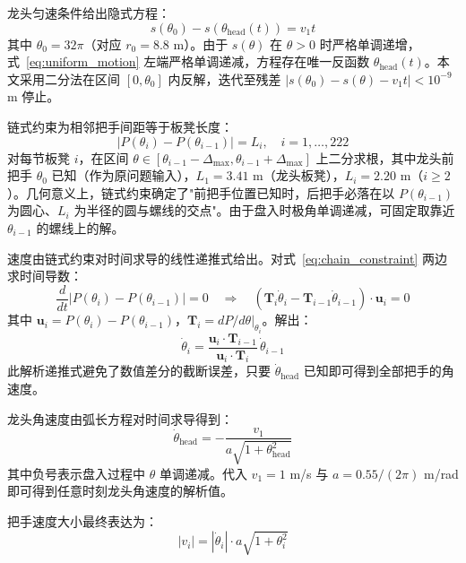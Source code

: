 \documentclass[12pt,a4paper]{article}
\begin{document}
龙头匀速条件给出隐式方程：
\begin{equation}
s(\theta_0) - s(\theta_{\text{head}}(t)) = v_1 t
\label{eq:uniform_motion}
\end{equation}
其中 $\theta_0=32\pi$（对应 $r_0=8.8$ m）。由于 $s(\theta)$ 在 $\theta>0$ 时严格单调递增，式~\eqref{eq:uniform_motion} 左端严格单调递减，方程存在唯一反函数 $\theta_{\text{head}}(t)$。本文采用二分法在区间 $[0,\theta_0]$ 内反解，迭代至残差 $|s(\theta_0)-s(\theta)-v_1t|<10^{-9}$ m 停止。

链式约束为相邻把手间距等于板凳长度：
\begin{equation}
|P(\theta_i)-P(\theta_{i-1})| = L_i,\quad i=1,\ldots,222
\label{eq:chain_constraint}
\end{equation}
对每节板凳 $i$，在区间 $\theta\in[\theta_{i-1}-\Delta_{\max},\theta_{i-1}+\Delta_{\max}]$ 上二分求根，其中龙头前把手 $\theta_0$ 已知（作为原问题输入），$L_1=3.41$ m（龙头板凳），$L_i=2.20$ m（$i\geq 2$）。几何意义上，链式约束确定了"前把手位置已知时，后把手必落在以 $P(\theta_{i-1})$ 为圆心、$L_i$ 为半径的圆与螺线的交点"。由于盘入时极角单调递减，可固定取靠近 $\theta_{i-1}$ 的螺线上的解。

速度由链式约束对时间求导的线性递推式给出。对式~\eqref{eq:chain_constraint} 两边求时间导数：
\begin{equation}
\frac{d}{dt}|P(\theta_i)-P(\theta_{i-1})| = 0
\quad\Rightarrow\quad
(\mathbf{T}_i\dot{\theta}_i - \mathbf{T}_{i-1}\dot{\theta}_{i-1})\cdot\mathbf{u}_i = 0
\end{equation}
其中 $\mathbf{u}_i = P(\theta_i)-P(\theta_{i-1})$，$\mathbf{T}_i = dP/d\theta|_{\theta_i}$。解出：
\begin{equation}
\dot{\theta}_i = \frac{\mathbf{u}_i\cdot\mathbf{T}_{i-1}}{\mathbf{u}_i\cdot\mathbf{T}_i}\,\dot{\theta}_{i-1}
\label{eq:theta_dot_recurrence}
\end{equation}
此解析递推式避免了数值差分的截断误差，只要 $\dot{\theta}_{\text{head}}$ 已知即可得到全部把手的角速度。

龙头角速度由弧长方程对时间求导得到：
\begin{equation}
\dot{\theta}_{\text{head}} = -\frac{v_1}{a\sqrt{1+\theta_{\text{head}}^2}}
\label{eq:head_omega}
\end{equation}
其中负号表示盘入过程中 $\theta$ 单调递减。代入 $v_1=1$ m/s 与 $a=0.55/(2\pi)$ m/rad 即可得到任意时刻龙头角速度的解析值。

把手速度大小最终表达为：
\begin{equation}
|v_i| = |\dot{\theta}_i| \cdot a\sqrt{1+\theta_i^2}
\end{equation}
\end{document}
